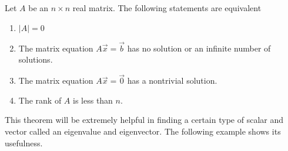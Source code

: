 \begin{theorem} \label{thm:sing:matrices}

Let $A$ be an $n \times n$ real matrix.  The following statements are equivalent

\begin{enumerate}
\item $|A|=0$
\item The matrix equation $A \vec{x} = \vec{b}$ has no solution or an infinite number of solutions.
\item The matrix equation $A \vec{x} = \vec{0}$ has a nontrivial solution. 
\item The rank of $A$ is less than $n$.  
\end{enumerate}

\end{theorem}


This theorem will be extremely helpful in finding a certain type of scalar and vector called an eigenvalue and eigenvector.  The following example shows its usefulness. 

